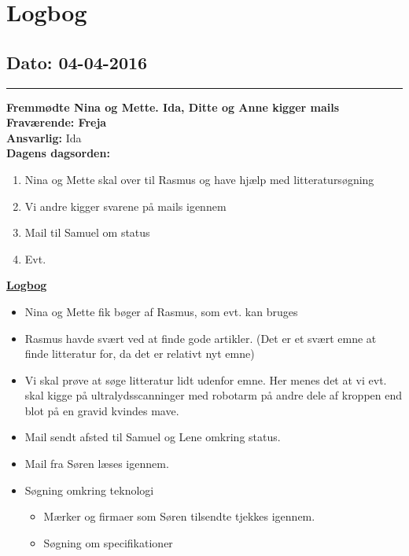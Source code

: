 \chapter{Logbog}
\section{Dato: 04-04-2016}
\hrule
\textbf{Fremmødte Nina og Mette. Ida, Ditte og Anne kigger mails} \\
\textbf{Fraværende: Freja } \\
\textbf{Ansvarlig:} Ida  \\
\textbf{Dagens dagsorden: }
\begin{enumerate}
	\item Nina og Mette skal over til Rasmus og have hjælp med litteratursøgning
	\item Vi andre kigger svarene på mails igennem
	\item Mail til Samuel om status 
	\item Evt. 
\end{enumerate}

\underline{\textbf{Logbog}}
\begin{itemize}
\item Nina og Mette fik bøger af Rasmus, som evt. kan bruges
\item Rasmus havde svært ved at finde gode artikler. (Det er et svært emne at finde litteratur for, da det er relativt nyt emne)
\item Vi skal prøve at søge litteratur lidt udenfor emne. Her menes det at vi evt. skal kigge på ultralydsscanninger med robotarm på andre dele af kroppen end blot på en gravid kvindes mave.
\end{itemize}
\begin{itemize}
\item Mail sendt afsted til Samuel og Lene omkring status.
\item Mail fra Søren læses igennem. 
\item Søgning omkring teknologi
\begin{itemize}
\item Mærker og firmaer som Søren tilsendte tjekkes igennem.
\item Søgning om specifikationer
\end{itemize}
\end{itemize}
\newpage
